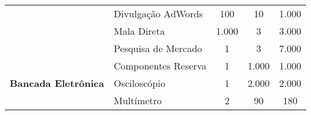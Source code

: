\begin{table}[h]
{\begin{tabular}{clccc}
		\multicolumn{1}{|c|}{}                                                                                                      & \multicolumn{1}{l|}{Divulgação AdWords}       & \multicolumn{1}{c|}{100}                 & \multicolumn{1}{c|}{10}                                                                      & \multicolumn{1}{c|}{1.000}                                                                \\ \cline{2-5} 
		\multicolumn{1}{|c|}{}                                                                                                      & \multicolumn{1}{l|}{Mala Direta}              & \multicolumn{1}{c|}{1.000}               & \multicolumn{1}{c|}{3}                                                                       & \multicolumn{1}{c|}{3.000}                                                                \\ \cline{2-5} 
		\multicolumn{1}{|c|}{}                                                                                                      & \multicolumn{1}{l|}{Pesquisa de Mercado}      & \multicolumn{1}{c|}{1}                   & \multicolumn{1}{c|}{3}                                                                       & \multicolumn{1}{c|}{7.000}                                                                \\ \hline
		\multicolumn{1}{|c|}{\multirow{5}{*}{\textbf{Bancada Eletrônica}}}                                                          & \multicolumn{1}{l|}{Componentes Reserva}      & \multicolumn{1}{c|}{1}                   & \multicolumn{1}{c|}{1.000}                                                                   & \multicolumn{1}{c|}{1.000}                                                                \\ \cline{2-5} 
		\multicolumn{1}{|c|}{}                                                                                                      & \multicolumn{1}{l|}{Osciloscópio}             & \multicolumn{1}{c|}{1}                   & \multicolumn{1}{c|}{2.000}                                                                   & \multicolumn{1}{c|}{2.000}                                                                \\ \cline{2-5} 
		\multicolumn{1}{|c|}{}                                                                                                      & \multicolumn{1}{l|}{Multímetro}               & \multicolumn{1}{c|}{2}                   & \multicolumn{1}{c|}{90}                                                                      & \multicolumn{1}{c|}{180}                                                                  \\ \cline{2-5} 

\end{tabular}}
\end{table}
